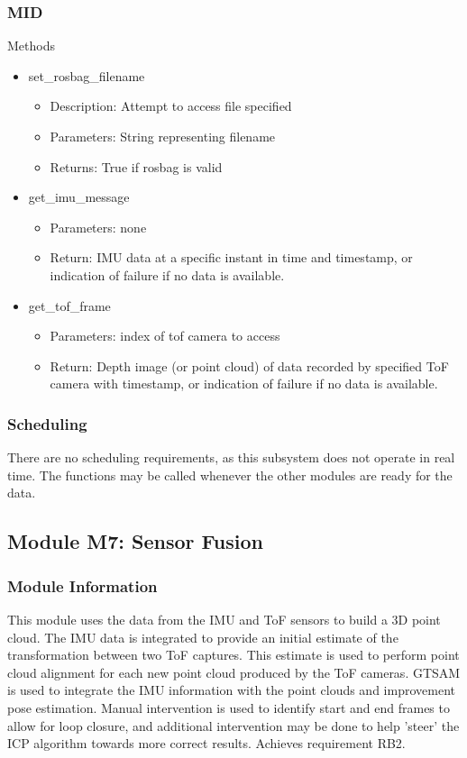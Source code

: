 \documentclass[11pt]{article}
\begin{document}
			\subsubsection{MID}
Methods 
\begin{itemize}
\item set\_rosbag\_filename 
	\begin{itemize}
\item Description: Attempt to access file specified 
\item Parameters: String representing filename 
\item Returns: True if rosbag is valid 
	\end{itemize}
\item get\_imu\_message 
	\begin{itemize}
\item Parameters: none 
\item Return: IMU data at a specific instant in time and timestamp, or indication of failure if no data is available. 
	\end{itemize}
\item get\_tof\_frame 
	\begin{itemize}
\item Parameters: index of tof camera to access 
\item Return: Depth image (or point cloud) of data recorded by specified ToF camera with timestamp, or indication of failure if no data is available. 
	\end{itemize}

\end{itemize}
			\subsubsection{Scheduling}
			There are no scheduling requirements, as this subsystem does not operate in real time. The functions may be called whenever the other modules are ready for the data. 


		\subsection{Module M7: Sensor Fusion}
			\subsubsection{Module Information}
			This module uses the data from the IMU and ToF sensors to build a 3D point cloud. The IMU data is integrated to provide an initial estimate of the transformation between two ToF captures. This estimate is used to perform point cloud alignment for each new point cloud produced by the ToF cameras. GTSAM is used to integrate the IMU information with the point clouds and improvement pose estimation. Manual intervention is used to identify start and end frames to allow for loop closure, and additional intervention may be done to help 'steer' the ICP algorithm towards more correct results. Achieves requirement RB2.
\end{document}
